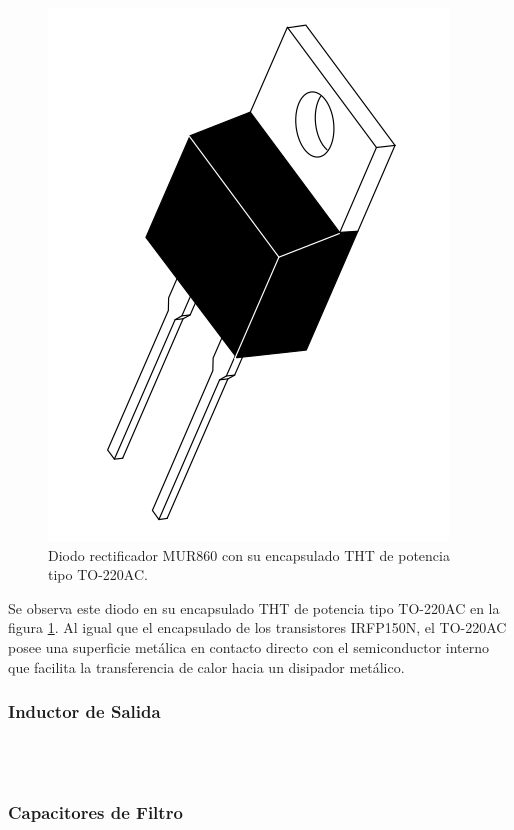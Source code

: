 \begin{figure}[h]
    \centering
    \includegraphics[scale=0.18]{Imagenes/MUR860.png}
    \caption{Diodo rectificador MUR860 con su encapsulado THT de potencia tipo TO-220AC.}
    \label{mur860}
\end{figure}

Se observa este diodo en su encapsulado THT de potencia tipo TO-220AC en la figura \ref{mur860}. Al igual que el encapsulado de los transistores IRFP150N, el TO-220AC posee una superficie metálica en contacto directo con el semiconductor interno que facilita la transferencia de calor hacia un disipador metálico.\\

\subsubsection{Inductor de Salida}

\lipsum[5]\\

\lipsum[6]\\

\subsubsection{Capacitores de Filtro}

\lipsum[7]\\

\lipsum[8]\\